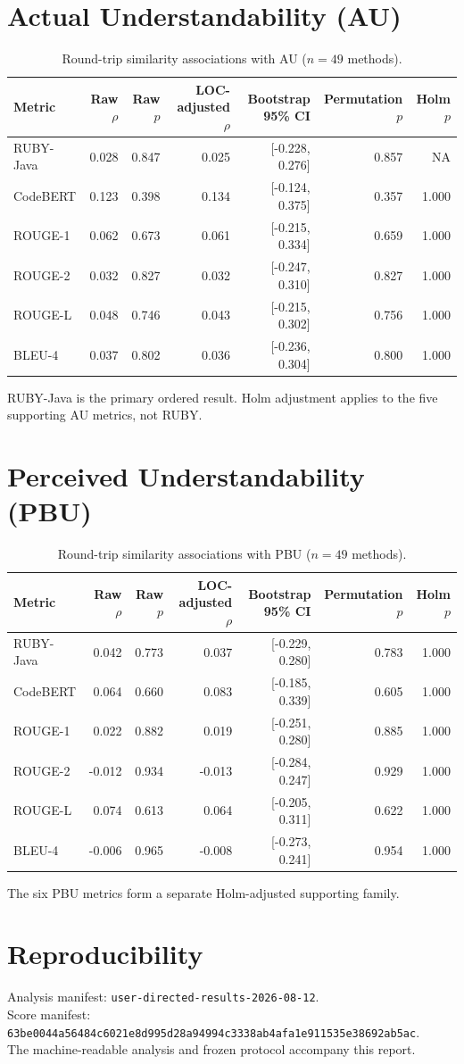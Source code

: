 \documentclass[11pt]{article}
\begin{document}
\section{Actual Understandability (AU)}
\begin{table}[htbp]
\centering
\caption{Round-trip similarity associations with AU ($n=49$ methods).}
\label{tab:au}
\small
\begin{tabular}{lrrrrrr}
\toprule
Metric & Raw $\rho$ & Raw $p$ & LOC-adjusted $\rho$ & Bootstrap 95\% CI & Permutation $p$ & Holm $p$ \\
\midrule
RUBY-Java & 0.028 & 0.847 & 0.025 & [-0.228, 0.276] & 0.857 & NA \\
CodeBERT & 0.123 & 0.398 & 0.134 & [-0.124, 0.375] & 0.357 & 1.000 \\
ROUGE-1 & 0.062 & 0.673 & 0.061 & [-0.215, 0.334] & 0.659 & 1.000 \\
ROUGE-2 & 0.032 & 0.827 & 0.032 & [-0.247, 0.310] & 0.827 & 1.000 \\
ROUGE-L & 0.048 & 0.746 & 0.043 & [-0.215, 0.302] & 0.756 & 1.000 \\
BLEU-4 & 0.037 & 0.802 & 0.036 & [-0.236, 0.304] & 0.800 & 1.000 \\
\bottomrule
\end{tabular}
\end{table}
RUBY-Java is the primary ordered result. Holm adjustment applies to the five supporting AU metrics, not RUBY.
\section{Perceived Understandability (PBU)}
\begin{table}[htbp]
\centering
\caption{Round-trip similarity associations with PBU ($n=49$ methods).}
\label{tab:pbu}
\small
\begin{tabular}{lrrrrrr}
\toprule
Metric & Raw $\rho$ & Raw $p$ & LOC-adjusted $\rho$ & Bootstrap 95\% CI & Permutation $p$ & Holm $p$ \\
\midrule
RUBY-Java & 0.042 & 0.773 & 0.037 & [-0.229, 0.280] & 0.783 & 1.000 \\
CodeBERT & 0.064 & 0.660 & 0.083 & [-0.185, 0.339] & 0.605 & 1.000 \\
ROUGE-1 & 0.022 & 0.882 & 0.019 & [-0.251, 0.280] & 0.885 & 1.000 \\
ROUGE-2 & -0.012 & 0.934 & -0.013 & [-0.284, 0.247] & 0.929 & 1.000 \\
ROUGE-L & 0.074 & 0.613 & 0.064 & [-0.205, 0.311] & 0.622 & 1.000 \\
BLEU-4 & -0.006 & 0.965 & -0.008 & [-0.273, 0.241] & 0.954 & 1.000 \\
\bottomrule
\end{tabular}
\end{table}
The six PBU metrics form a separate Holm-adjusted supporting family.
\section{Reproducibility}
Analysis manifest: \texttt{user-directed-results-2026-08-12}.\\
Score manifest: \texttt{63be0044a56484c6021e8d995d28a94994c3338ab4afa1e911535e38692ab5ac}.\\
The machine-readable analysis and frozen protocol accompany this report.
\end{document}
